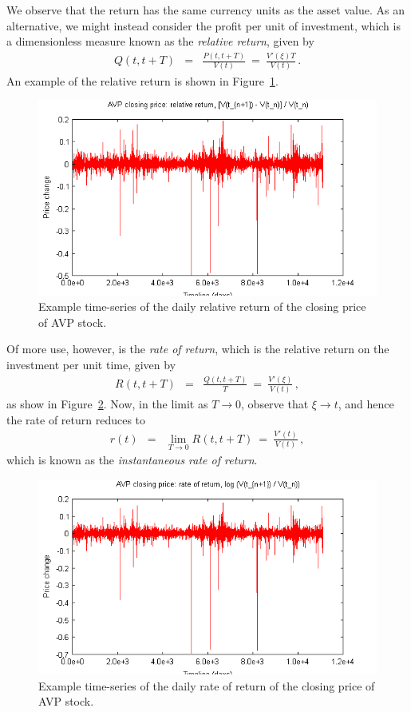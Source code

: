\documentclass[a4paper]{book}
\begin{document}
We observe that the return has the same currency units as
the asset value. As an alternative, we might instead 
consider the profit per unit of investment, which is
a dimensionless measure 
known as the {\em relative return}, given by
\begin{eqnarray}
  Q(t,t+T) & = & \frac{P(t,t+T)}{V(t)}~=~\frac{V'(\xi)T}{V(t)}\,.
\end{eqnarray}
An example of the relative return 
is shown in Figure~\ref{fig:avp-price-simple}.
\begin{figure}[hbt]
\includegraphics[scale=0.8]{figures/avp-price-close-simple.png}
\caption{Example time-series of the daily relative return of
the closing price of AVP stock.}
\label{fig:avp-price-simple}
\end{figure}

Of more use, however, is the {\em rate of return}, which is
the relative return on the investment per unit time, given by
\begin{eqnarray}
  R(t,t+T) & = & \frac{Q(t,t+T)}{T}~=~\frac{V'(\xi)}{V(t)}\,,
\end{eqnarray}
as show in Figure~\ref{fig:avp-price-log}.
Now, in the limit as $T\rightarrow 0$, observe that $\xi\rightarrow t$, and
hence the rate of return reduces to
\begin{eqnarray}
  r(t) & = & \lim_{T\rightarrow 0}R(t,t+T) ~=~\frac{V'(t)}{V(t)}\,,
\label{eq:inst-rate-return}
\end{eqnarray}
which is known as the {\em instantaneous rate of return}.
\begin{figure}[hbt]
\includegraphics[scale=0.8]{figures/avp-price-close-log.png}
\caption{Example time-series of the daily rate of return of
the closing price of AVP stock.}
\label{fig:avp-price-log}
\end{figure}
\end{document}

